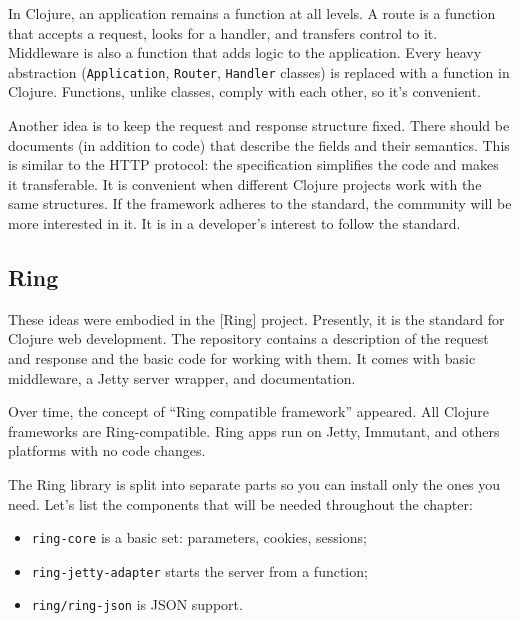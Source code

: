 \label{http-all-function}

In Clojure, an application remains a function at all levels. A route is a function that accepts a request, looks for a handler, and transfers control to it. Middleware
is also a function that adds logic to the application. Every heavy abstraction (\verb|Application|, \verb|Router|, \verb|Handler| classes) is replaced with a function in Clojure. Functions, unlike classes, comply with each other, so it's convenient.

Another idea is to keep the request and response structure fixed. There should be documents (in addition to code) that describe the fields and their semantics. This is similar to the HTTP protocol: the specification simplifies the code and makes it transferable. It is convenient when different Clojure projects work with the same structures. If the framework adheres to the standard, the community will be more interested in it. It is in a developer's interest to follow the standard.

\subsection{Ring}

\label{ring-jetty}

These ideas were embodied in the [Ring] project.
Presently, it is the standard for Clojure web development. The repository contains a description of the request and response and the basic code for working with them. It comes with basic middleware, a Jetty server wrapper, and documentation.


Over time, the concept of ``Ring compatible framework'' appeared. All Clojure frameworks are Ring-compatible. Ring apps run on Jetty, Immutant, and others platforms with no code changes.

The Ring library is split into separate parts so you can install only the ones you need. Let's list the components that will be needed throughout the chapter:

\begin{itemize}

\item
\verb|ring-core| is a basic set: parameters, cookies, sessions;

\item
\verb|ring-jetty-adapter| starts the server from a function;

\item
\verb|ring/ring-json| is JSON support.

\end{itemize}

